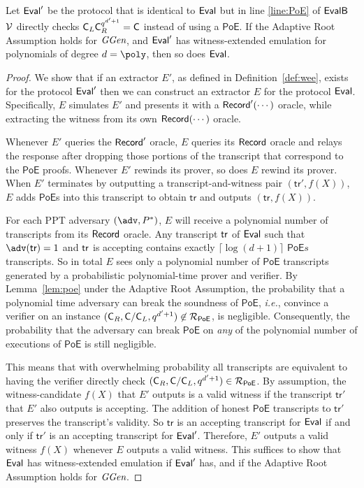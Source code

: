 \begin{lemma} \label{lemma:poe_security}
Let $\textsf{{Eval}}'$ be the protocol that is identical to $\textsf{{Eval}}$ but in line \ref{line:PoE} of $\textsf{{EvalB}}$ $\mathcal{V}$ directly checks $\gr{C}_L\gr{C}_R^{q^{d'+1}}=\gr{C}$ instead of using a $\textsf{PoE}$. If the Adaptive Root Assumption holds for $\textit{GGen}$, and $\textsf{{Eval}}'$ has witness-extended emulation for polynomials of degree $d=\poly$, then so does $\textsf{{Eval}}$.
\end{lemma}

\begin{proof}
We show that if an extractor $E'$, as defined in Definition~\ref{def:wee}, exists for the protocol $\textsf{{Eval}}'$ then we can construct an extractor $E$ for the protocol $\textsf{{Eval}}$. Specifically, $E$ simulates $E'$ and presents it with a $\textsf{{Record}}'(\cdots)$ oracle, while extracting the witness from its own $\textsf{{Record}}(\cdots)$ oracle.

Whenever $E'$ queries the $\textsf{{Record}}'$ oracle, $E$ queries its $\textsf{{Record}}$ oracle and relays the response after dropping those portions of the transcript that correspond to the $\mathsf{PoE}$ proofs. Whenever $E'$ rewinds its prover, so does $E$ rewind its prover. When $E'$ terminates by outputting a transcript-and-witness pair $(\mathsf{tr}', f(X))$, $E$ adds $\mathsf{PoE}$s into this transcript to obtain $\mathsf{tr}$ and outputs $(\mathsf{tr}, f(X))$.

For each PPT adversary $(\adv,P^*)$, $E$ will receive a polynomial number of transcripts from its $\textsf{{Record}}$ oracle. Any transcript $\textsf{{tr}}$ of $\textsf{{Eval}}$ such that $\adv(\tr)=1$ and $\textsf{{tr}}$ is accepting contains exactly $\lceil \log(d+1)\rceil$ $\textsf{PoE}s$ transcripts. 
So in total $E$ sees only a polynomial number of $\textsf{PoE}$ transcripts generated by a probabilistic polynomial-time prover and verifier. By Lemma~\ref{lem:poe} under the Adaptive Root Assumption, the probability that a polynomial time adversary can break the soundness of $\textsf{PoE}$, \emph{i.e.}, convince a verifier on an instance $(\gr{C}_R,\gr{C}/\gr{C}_{L},q^{d'+1})\not\in\mathcal{R}_{\textsf{PoE}}$, is negligible. 
Consequently, the probability that the adversary can break $\textsf{PoE}$ on \emph{any} of the polynomial number of executions of $\mathsf{PoE}$ is still negligible.

This means that with overwhelming probability all transcripts are equivalent to having the verifier directly check $(\gr{C}_R,\gr{C}/\gr{C}_{L},q^{d'+1})\in\mathcal{R}_{\textsf{PoE}}$. By assumption, the witness-candidate $f(X)$ that $E'$ outputs is a valid witness if the transcript $\mathsf{tr}'$ that $E'$ also outputs is accepting. The addition of honest $\mathsf{PoE}$ transcripts to $\mathsf{tr}'$ preserves the transcript's validity. So $\mathsf{tr}$ is an accepting transcript for $\textsf{{Eval}}$ if and only if $\mathsf{tr}'$ is an accepting transcript for $\textsf{{Eval}}'$. Therefore, $E'$ outputs a valid witness $f(X)$ whenever $E$ outputs a valid witness. This suffices to show that $\textsf{{Eval}}$ has witness-extended emulation if $\textsf{{Eval}}'$ has, and if the Adaptive Root Assumption holds for $\textit{GGen}$.
\end{proof}



